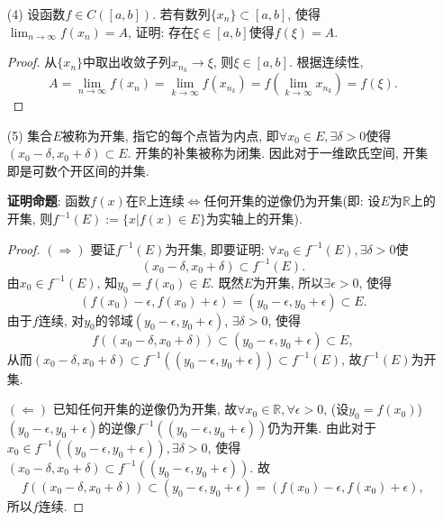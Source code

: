 \documentclass[UTF8,11pt, a4paper, oneside, fontset=none]{ctexbook}
\begin{document}
\begin{itemize}
\begin{proof}

$\Rightarrow$. 利用连续性的定义, $\forall \epsilon>0$充分小, $\exists \delta>0$, 使得当$x \in U(a, \delta)$时, $|f(x) - f(x_0)| < \epsilon$. 则$\forall y_1, y_2 \in U(a, \delta)$, 则$|f(y_1) - f(y_2)|  < 2 \epsilon$. 注意$\sup_{x \in U(a, \delta)}\{ f(x)\} - \inf_{x \in U(a, \delta)}\{ f(x)\} = \sup_{x, x' \in U(a, \delta)} |f(x) - f(x')|$. 因此$\omega_f(a, \delta) < 2\epsilon$. 即证. 

$\Leftarrow$. 类似可证.


\end{proof}

\item[(4)] 设函数$f \in C([a, b])$. 若有数列$\{x_n\} \subset [a, b]$, 使得$\lim_{n \to \infty}f(x_n)=A$, 证明: 存在$\xi \in [a, b]$使得$f(\xi) = A$.

\begin{proof}
从$\{x_n\}$中取出收敛子列$x_{n_k} \to \xi$, 则$\xi \in [a, b]$. 根据连续性, 
\[
A = \lim_{n \to \infty}f(x_n) = \lim_{k \to \infty}f(x_{n_k}) = f( \lim_{k \to \infty} x_{n_k}) = f(\xi).
\]

\end{proof}


\item[(5)] 集合$E$被称为开集, 指它的每个点皆为内点, 即$\forall x_0 \in E, \exists \delta >0$使得$(x_0 - \delta, x_0 + \delta ) \subset E$. 开集的补集被称为闭集. 因此对于一维欧氏空间, 开集即是可数个开区间的并集.

{\bf 证明命题}: 函数$f(x)$在$\mathbb R$上连续$\Leftrightarrow$任何开集的逆像仍为开集(即: 设$E$为$\mathbb R$上的开集, 则$f^{-1}(E) := \{ x | f(x) \in E \}$为实轴上的开集).

\begin{proof}

$(\Rightarrow)$ 要证$f^{-1}(E)$为开集, 即要证明: $\forall x_0 \in f^{-1}(E), \exists \delta >0$使
\[
(x_0 - \delta, x_0 + \delta ) \subset f^{-1}(E).
\]
由$x_0 \in f^{-1}(E)$, 知$y_0 = f(x_0) \in E$. 既然$E$为开集, 所以$\exists \epsilon>0$, 使得
\[
(f(x_0) - \epsilon, f(x_0) + \epsilon) = (y_0 - \epsilon, y_0 + \epsilon) \subset E.
\]
由于$f$连续, 对$y_0$的邻域$(y_0 - \epsilon, y_0 + \epsilon)$, $\exists \delta >0$, 使得
\[
f((x_0 - \delta, x_0 + \delta )) \subset (y_0 - \epsilon, y_0 + \epsilon) \subset E,
\]
从而$(x_0 - \delta, x_0 + \delta ) \subset f^{-1}((y_0 - \epsilon, y_0 + \epsilon)) \subset f^{-1}(E)$, 故$f^{-1}(E)$为开集.


$(\Leftarrow)$ 已知任何开集的逆像仍为开集, 故$\forall x_0 \in \mathbb R, \forall \epsilon>0$, (设$y_0 = f(x_0)$) $(y_0 - \epsilon, y_0 + \epsilon)$的逆像$f^{-1}((y_0 - \epsilon, y_0 + \epsilon))$仍为开集. 由此对于$x_0 \in f^{-1}((y_0 - \epsilon, y_0 + \epsilon)), \exists \delta >0$, 使得$(x_0 - \delta, x_0 + \delta ) \subset f^{-1}((y_0 - \epsilon, y_0 + \epsilon))$. 故
\[
f((x_0 - \delta, x_0 + \delta )) \subset (y_0 - \epsilon, y_0 + \epsilon) = (f(x_0) - \epsilon, f(x_0) + \epsilon), 
\]
所以$f$连续.
\end{proof}



\end{itemize}
\end{document}
